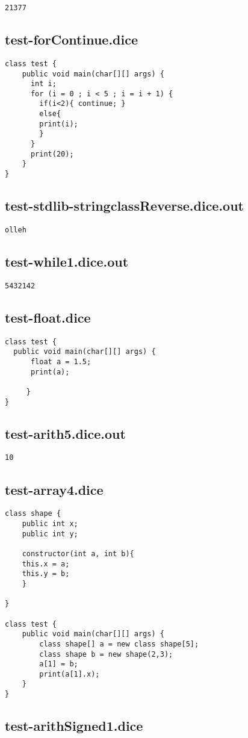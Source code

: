\begin{verbatim}
21377
\end{verbatim}\pagebreak\subsection{test-forContinue.dice}
\begin{verbatim}
class test {
	public void main(char[][] args) {
	  int i;
	  for (i = 0 ; i < 5 ; i = i + 1) {
	  	if(i<2){ continue; }
	  	else{
	    print(i);
	    }
	  }
	  print(20);
	}
}

\end{verbatim}\pagebreak\subsection{test-stdlib-stringclassReverse.dice.out}
\begin{verbatim}
olleh
\end{verbatim}\pagebreak\subsection{test-while1.dice.out}
\begin{verbatim}
5432142
\end{verbatim}\pagebreak\subsection{test-float.dice}
\begin{verbatim}
class test {
  public void main(char[][] args) {
      float a = 1.5;
      print(a);

     }
}
\end{verbatim}\pagebreak\subsection{test-arith5.dice.out}
\begin{verbatim}
10
\end{verbatim}\pagebreak\subsection{test-array4.dice}
\begin{verbatim}
class shape {
	public int x;
	public int y;

	constructor(int a, int b){
	this.x = a;
	this.y = b;
	}

}

class test {
	public void main(char[][] args) {
		class shape[] a = new class shape[5];
		class shape b = new shape(2,3);
		a[1] = b;
		print(a[1].x);
	}
}

\end{verbatim}\pagebreak\subsection{test-arithSigned1.dice}
